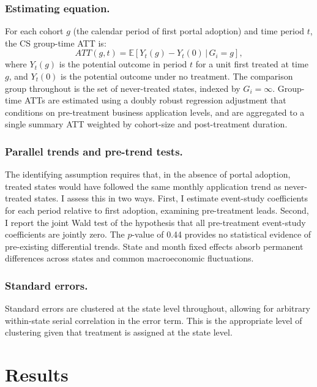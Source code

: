 \documentclass[12pt]{article}
\newcommand{\E}{\mathbb{E}}
\begin{document}
\subsubsection*{Estimating equation.}
For each cohort $g$ (the calendar period of first portal adoption) and time period $t$, the CS group-time ATT is:
\begin{equation}
ATT(g,t) = \E\!\left[Y_t(g) - Y_t(0) \,\big|\, G_i = g\right],
\end{equation}
where $Y_t(g)$ is the potential outcome in period $t$ for a unit first treated at time $g$, and $Y_t(0)$ is the potential outcome under no treatment. The comparison group throughout is the set of never-treated states, indexed by $G_i = \infty$. Group-time ATTs are estimated using a doubly robust regression adjustment that conditions on pre-treatment business application levels, and are aggregated to a single summary ATT weighted by cohort-size and post-treatment duration.

\subsubsection*{Parallel trends and pre-trend tests.}
The identifying assumption requires that, in the absence of portal adoption, treated states would have followed the same monthly application trend as never-treated states. I assess this in two ways. First, I estimate event-study coefficients for each period relative to first adoption, examining pre-treatment leads. Second, I report the joint Wald test of the hypothesis that all pre-treatment event-study coefficients are jointly zero. The $p$-value of 0.44 provides no statistical evidence of pre-existing differential trends. State and month fixed effects absorb permanent differences across states and common macroeconomic fluctuations.

\subsubsection*{Standard errors.}
Standard errors are clustered at the state level throughout, allowing for arbitrary within-state serial correlation in the error term. This is the appropriate level of clustering given that treatment is assigned at the state level.

\section{Results}
\end{document}
